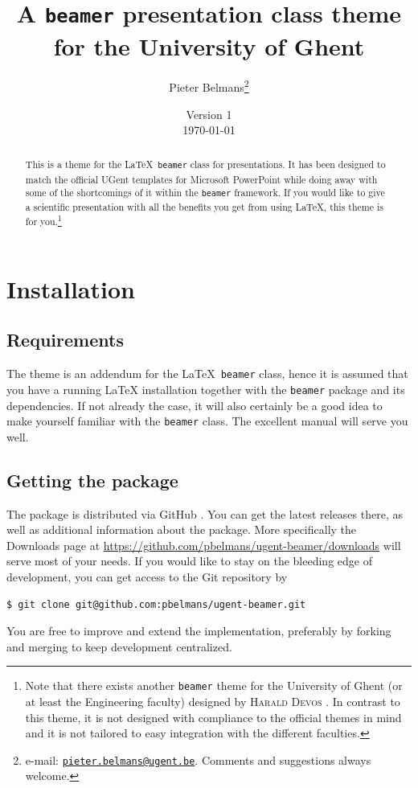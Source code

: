 \documentclass[a4paper,10pt]{article}
\title{A \texttt{beamer} presentation class theme for the University of Ghent}
\author{Pieter Belmans\thanks{e-mail: \href{mailto:pieter.belmans@ugent.be}{\nolinkurl{pieter.belmans@ugent.be}}. Comments and suggestions always welcome.}}
\date{Version 1 \\ \today}
\begin{document}
\maketitle

\begin{abstract}
  This is a theme for the \LaTeX\ \texttt{beamer} class for presentations. It has been designed to match the official UGent templates for Microsoft PowerPoint\textsuperscript{\textregistered} while doing away with some of the shortcomings of it within the \texttt{beamer} framework. If you would like to give a scientific presentation with all the benefits you get from using \LaTeX, this theme is for you.\footnote{Note that there exists another \texttt{beamer} theme for the University of Ghent (or at least the Engineering faculty) designed by \textsc{Harald Devos} \cite{devos-theme}. In contrast to this theme, it is not designed with compliance to the official themes in mind and it is not tailored to easy integration with the different faculties.}
\end{abstract}


\section{Installation}

\subsection{Requirements}
  The theme is an addendum for the \LaTeX\ \texttt{beamer} class, hence it is assumed that you have a running \LaTeX{} installation together with the \texttt{beamer} package \cite{beamer-repository} and its dependencies. If not already the case, it will also certainly be a good idea to make yourself familiar with the \texttt{beamer} class. The excellent manual \cite{beamer-manual} will serve you well.

\subsection{Getting the package}

The package is distributed via GitHub \cite{ugent-beamer}. You can get the latest releases there, as well as additional information about the package. More specifically the Downloads page at \url{https://github.com/pbelmans/ugent-beamer/downloads} will serve most of your needs. If you would like to stay on the bleeding edge of development, you can get access to the Git repository by
\begin{lstlisting}
$ git clone git@github.com:pbelmans/ugent-beamer.git
\end{lstlisting}
You are free to improve and extend the implementation, preferably by forking and merging to keep development centralized.
\end{document}
